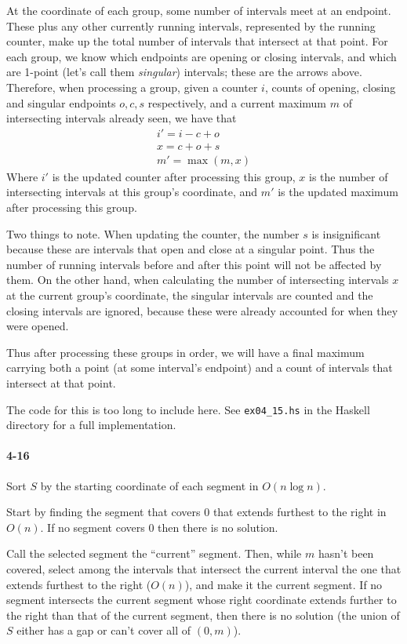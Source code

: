 \documentclass{report}
\begin{document}
At the coordinate of each group, some number of intervals meet at an endpoint. These plus any other currently running intervals, represented by the running counter, make up the total number of intervals that intersect at that point. For each group, we know which endpoints are opening or closing intervals, and which are 1-point (let's call them \emph{singular}) intervals; these are the arrows above. Therefore, when processing a group, given a counter $i$, counts of opening, closing and singular endpoints $o, c, s$ respectively, and a current maximum $m$ of intersecting intervals already seen, we have that
\begin{gather*}
	i' = i - c + o \\
	x = c + o + s \\
	m' = \max(m, x)
\end{gather*}
Where $i'$ is the updated counter after processing this group, $x$ is the number of intersecting intervals at this group's coordinate, and $m'$ is the updated maximum after processing this group.

Two things to note. When updating the counter, the number $s$ is insignificant because these are intervals that open and close at a singular point. Thus the number of running intervals before and after this point will not be affected by them. On the other hand, when calculating the number of intersecting intervals $x$ at the current group's coordinate, the singular intervals are counted and the closing intervals are ignored, because these were already accounted for when they were opened.

Thus after processing these groups in order, we will have a final maximum carrying both a point (at some interval's endpoint) and a count of intervals that intersect at that point.

The code for this is too long to include here. See \lstinline!ex04_15.hs! in the Haskell directory for a full implementation.

\paragraph{4-16} Sort $S$ by the starting coordinate of each segment in $O(n\log n)$.

Start by finding the segment that covers 0 that extends furthest to the right in $O(n)$. If no segment covers 0 then there is no solution.

Call the selected segment the ``current'' segment. Then, while $m$ hasn't been covered, select among the intervals that intersect the current interval the one that extends furthest to the right ($O(n)$), and make it the current segment. If no segment intersects the current segment whose right coordinate extends further to the right than that of the current segment, then there is no solution (the union of $S$ either has a gap or can't cover all of $(0,m)$).
\end{document}
